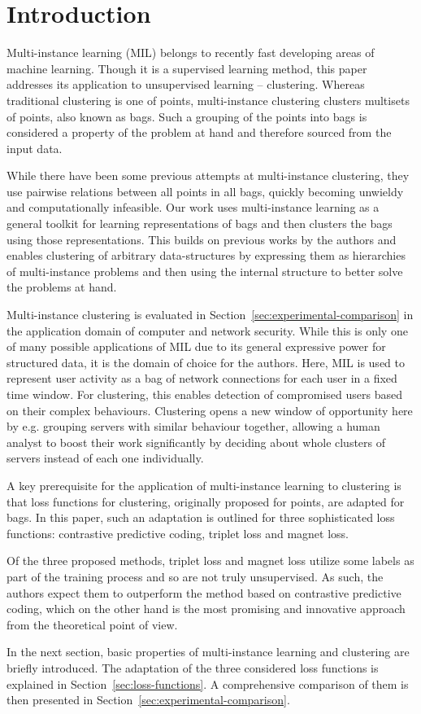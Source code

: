 \section{Introduction}

Multi-instance learning (MIL) belongs to recently fast developing areas of machine learning. Though it is a supervised learning method, this paper addresses its application to unsupervised learning -- clustering. Whereas traditional clustering is one of points, multi-instance clustering clusters multisets of points, also known as bags. Such a grouping of the points into bags is considered a property of the problem at hand and therefore sourced from the input data.

While there have been some previous attempts at multi-instance clustering, they use pairwise relations between all points in all bags, quickly becoming unwieldy and computationally infeasible. Our work uses multi-instance learning as a general toolkit for learning representations of bags and then clusters the bags using those representations. This builds on previous works by the authors and enables clustering of arbitrary data-structures by expressing them as hierarchies of multi-instance problems and then using the internal structure to better solve the problems at hand.

Multi-instance clustering is evaluated in Section~\ref{sec:experimental-comparison} in the application domain of computer and network security. While this is only one of many possible applications of MIL due to its general expressive power for structured data, it is the domain of choice for the authors. Here, MIL is used to represent user activity as a bag of network connections for each user in a fixed time window. For clustering, this enables detection of compromised users based on their complex behaviours. Clustering opens a new window of opportunity here by e.g. grouping servers with similar behaviour together, allowing a human analyst to boost their work significantly by deciding about whole clusters of servers instead of each one individually.

A key prerequisite for the application of multi-instance learning to clustering is that loss functions for clustering, originally proposed for points, are adapted for bags. In this paper, such an adaptation is outlined for three sophisticated loss functions: contrastive predictive coding, triplet loss and magnet loss.

Of the three proposed methods, triplet loss and magnet loss utilize some labels as part of the training process and so are not truly unsupervised. As such, the authors expect them to outperform the method based on contrastive predictive coding, which on the other hand is the most promising and innovative approach from the theoretical point of view.

In the next section, basic properties of multi-instance learning and clustering are briefly introduced. The adaptation of the three considered loss functions is explained in Section~\ref{sec:loss-functions}. A comprehensive comparison of them is then presented in Section~\ref{sec:experimental-comparison}.
